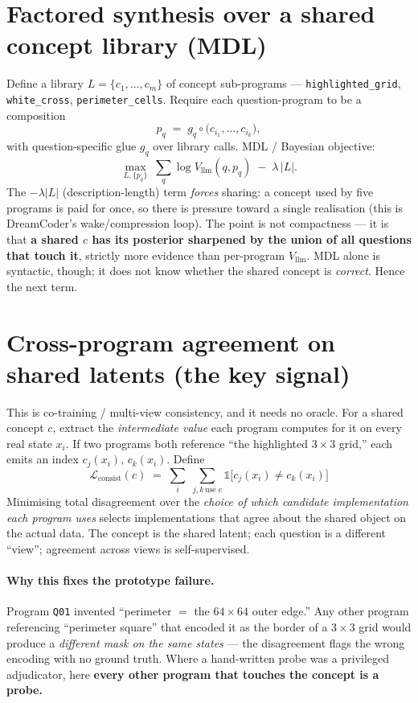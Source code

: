 \documentclass[11pt]{article}
\newcommand{\Vllm}{V_{\mathrm{llm}}}
\newcommand{\Lconsist}{\mathcal{L}_{\mathrm{consist}}}
\begin{document}
\section{Factored synthesis over a shared concept library (MDL)}

Define a library $L = \{c_1,\dots,c_m\}$ of concept sub-programs ---
\texttt{highlighted\_grid}, \texttt{white\_cross},
\texttt{perimeter\_cells}. Require each question-program to be a composition
\[
p_q \;=\; g_q \circ \big(c_{i_1},\dots,c_{i_k}\big),
\]
with question-specific glue $g_q$ over library calls. MDL / Bayesian objective:
\[
\max_{L,\{p_q\}} \;\sum_q \log \Vllm(q,p_q) \;-\; \lambda\,|L|.
\]
The $-\lambda|L|$ (description-length) term \emph{forces} sharing: a concept used
by five programs is paid for once, so there is pressure toward a single
realisation (this is DreamCoder's wake/compression loop). The point is not
compactness --- it is that \textbf{a shared $c$ has its posterior sharpened by
the union of all questions that touch it}, strictly more evidence than
per-program $\Vllm$. MDL alone is syntactic, though; it does not know whether the
shared concept is \emph{correct}. Hence the next term.

\section{Cross-program agreement on shared latents (the key signal)}

This is co-training / multi-view consistency, and it needs no oracle. For a
shared concept $c$, extract the \emph{intermediate value} each program computes
for it on every real state $x_i$. If two programs both reference ``the
highlighted $3{\times}3$ grid,'' each emits an index $c_j(x_i),\,c_k(x_i)$.
Define
\[
\boxed{\;\Lconsist(c) \;=\; \sum_i \;\sum_{j,k\,\text{use } c}
\mathbb{1}\!\big[c_j(x_i)\neq c_k(x_i)\big]\;}
\]
Minimising total disagreement over the \emph{choice of which candidate
implementation each program uses} selects implementations that agree about the
shared object on the actual data. The concept is the shared latent; each question
is a different ``view''; agreement across views is self-supervised.

\paragraph{Why this fixes the prototype failure.} Program \texttt{Q01} invented
``perimeter $=$ the $64{\times}64$ outer edge.'' Any other program referencing
``perimeter square'' that encoded it as the border of a $3{\times}3$ grid would
produce a \emph{different mask on the same states} --- the disagreement flags the
wrong encoding with no ground truth. Where a hand-written probe was a privileged
adjudicator, here \textbf{every other program that touches the concept is a
probe.}
\end{document}
